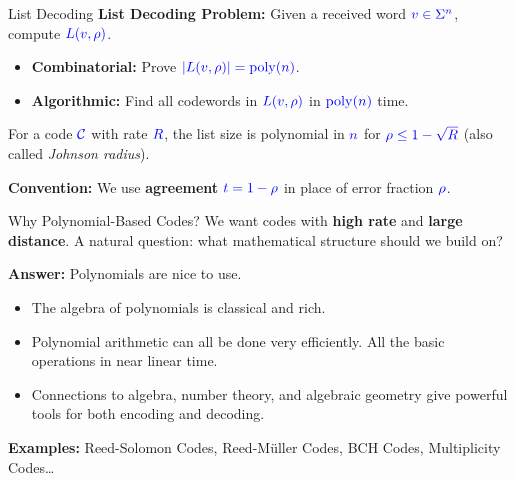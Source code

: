 \documentclass[10pt,handout]{beamer}
\DeclareMathOperator{\poly}{poly}
\begin{document}
\begin{frame}{List Decoding}
	\textbf{List Decoding Problem:} Given a received word $\textcolor{blue}{\textcolor{blue}{v\in \Sigma^n}}$, compute $\textcolor{blue}{\textcolor{blue}{L(v,\rho)}}$.\pause
	\begin{itemize}
		\item \textbf{Combinatorial:} Prove $\textcolor{blue}{\textcolor{blue}{|L(v,\rho)|=\poly(n)}}$.\pause
		\item \textbf{Algorithmic:} Find all codewords in $\textcolor{blue}{\textcolor{blue}{L(v,\rho)}}$ in $\textcolor{blue}{\textcolor{blue}{\poly(n)}}$ time.
	\end{itemize}\pause
	\vspace{0.5em}

	\begin{theorem}
		For a code $\textcolor{blue}{\textcolor{blue}{\mathcal{C}}}$ with rate $\textcolor{blue}{\textcolor{blue}{R}}$, the list size is polynomial in $\textcolor{blue}{\textcolor{blue}{n}}$ for $\textcolor{blue}{\textcolor{blue}{\rho\leq 1-\sqrt{R}}}$ (also called \emph{Johnson radius}).
	\end{theorem}\pause

	\vspace{0.6em}
	\textbf{Convention:} We use \textbf{agreement} $\textcolor{blue}{t = 1-\rho}$ in place of error fraction $\textcolor{blue}{\rho}$.
\end{frame}

\begin{frame}{Why Polynomial-Based Codes?}
	We want codes with \textbf{high rate} and \textbf{large distance}. A natural question: what mathematical structure should we build on?\pause

	\vspace{0.5em}
	\textbf{Answer:} Polynomials are nice to use.\pause
	\vspace{0.4em}

	\begin{itemize}
		\item  The algebra of polynomials is classical and rich.\pause
		\item  Polynomial arithmetic can all be done very efficiently. All the basic operations in near linear time.\pause
		\item Connections to algebra, number theory, and algebraic geometry give powerful tools for both encoding and decoding.
	\end{itemize}\pause
	\vspace{1em}

	\textbf{Examples:} Reed-Solomon Codes, Reed-M\"{u}ller Codes, BCH Codes, Multiplicity Codes\ldots
\end{frame}
\end{document}
